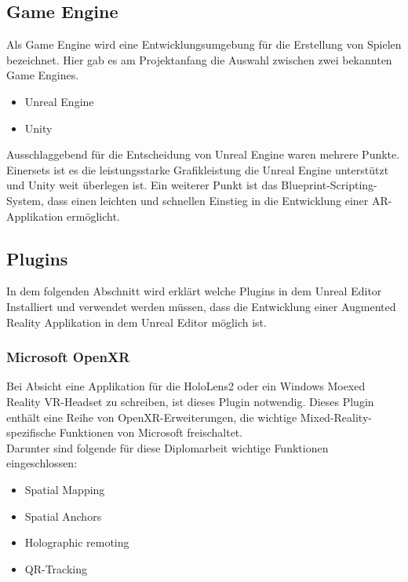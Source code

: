 \subsection{Game Engine}
Als Game Engine wird eine Entwicklungsumgebung für die Erstellung von Spielen bezeichnet.
Hier gab es am Projektanfang die Auswahl zwischen zwei bekannten Game Engines.
\begin{itemize}
    \item Unreal Engine
    \item Unity
\end{itemize}
Ausschlaggebend für die Entscheidung von Unreal Engine waren mehrere Punkte. Einersets ist es
die leistungsstarke Grafikleistung die Unreal Engine unterstützt und Unity weit überlegen ist.
Ein weiterer Punkt ist das Blueprint-Scripting-System, dass einen leichten und schnellen
Einstieg in die Entwicklung einer AR-Applikation ermöglicht.

\subsection{Plugins}
In dem folgenden Abschnitt wird erklärt welche Plugins in dem Unreal Editor
Installiert und verwendet werden müssen, dass die Entwicklung einer Augmented Reality
Applikation in dem Unreal Editor möglich ist.

\subsubsection{Microsoft OpenXR}
Bei Absicht eine Applikation für die HoloLens2 oder ein Windows Moexed Reality VR-Headset
zu schreiben, ist dieses Plugin notwendig. Dieses Plugin enthält eine Reihe von
OpenXR-Erweiterungen, die wichtige Mixed-Reality-spezifische Funktionen von Microsoft freischaltet. \\
Darunter sind folgende für diese Diplomarbeit wichtige Funktionen eingeschlossen:
\begin{itemize}
    \item Spatial Mapping
    \item Spatial Anchors
    \item Holographic remoting
    \item QR-Tracking
\end{itemize}

